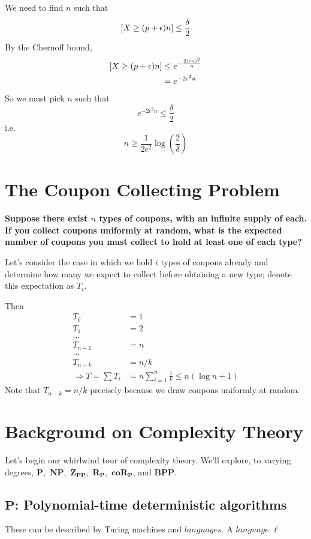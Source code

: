 \documentclass[11pt]{article}
\let\Pr\relax
\DeclareMathOperator*{\Pr}{\mathbb{P}}
\newcommand{\eps}{\epsilon}
\newcommand{\Pt}{\ensuremath{\mathbf{P}}}
\newcommand{\NP}{\ensuremath{\mathbf{NP}}}
\newcommand{\BPP}{\ensuremath{\mathbf{BPP}}}
\newcommand{\ZPP}{\ensuremath{\mathbf{Z_{PP}}}}
\newcommand{\RP}{\ensuremath{\mathbf{R_{P}}}}
\newcommand{\coRP}{\ensuremath{\mathbf{coR_{P}}}}
\let\ab\allowbreak
\begin{document}
We need to find $n$ such that
$$ \Pr[X \ge (p + \eps)n] \le \frac{\delta}{2} $$
By the Chernoff bound,
\begin{align*}
  \Pr[X \ge (p + \eps)n] &\le e^{-\frac{2(\eps n)^2}{n}} \\
                         &= e^{-2\eps^2 n}
\end{align*}
So we must pick $n$ such that
$$ e^{-2\eps^2 n} \le \frac \delta 2 $$
i.e.
$$ n \ge \frac{1}{2\eps^2}\log\left(\frac{2}{\delta} \right) $$

\section{The Coupon Collecting Problem}

\textbf{Suppose there exist $n$ types of coupons, with an infinite supply of each. If you collect coupons uniformly at random, what is the expected number of coupons you must collect to hold at least one of each type?}

Let's consider the case in which we hold $i$ types of coupons already and determine how many we expect to collect before obtaining a new type; denote this expectation as $T_i$.

Then
\begin{align*}
  T_0 &= 1 \\
  T_1 &= 2 \\
  \ldots \\
  T_{n-1} &= n \\
  \ldots \\
  T_{n-k} &= n / k \\
  \Rightarrow T = \sum{T_i} &= n \sum_{i=1}^n \frac{1}{k} \leq n(\log n + 1)
\end{align*}
Note that $T_{n-k} = n / k$ precisely because we draw coupons uniformly at random.

\section{Background on Complexity Theory}

Let's begin our whirlwind tour of complexity theory. We'll explore, to varying degrees, \Pt,\ \NP,\ab\ \ZPP,\ \RP,\ \coRP, and \BPP.

\subsection{\Pt: Polynomial-time deterministic algorithms}

These can be described by Turing machines and $languages$. A $language$ $\ell$
\end{document}
